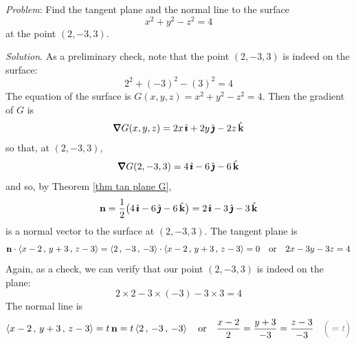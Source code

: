 \begin{eg}\label{eg tan plane D}
\noindent\textit{Problem}:
Find the tangent plane and the normal line to the surface
\begin{equation*}
x^2+y^2-z^2 = 4
\end{equation*}
at the point $(2,-3,3)$.

\medskip
\noindent\textit{Solution}. 
As a preliminary check, note that the point $(2,-3,3)$ is indeed on the surface:
\begin{equation*}
2^2+(-3)^2-(3)^2=4
\end{equation*} 
The equation of the surface is $G(x,y,z)=x^2+y^2-z^2=4$.
Then the gradient of $G$ is
\begin{align*}
\vnabla G(x,y,z) = 2x\,\hi +2y\,\hj-2z\,\hk
\end{align*}
so that, at $(2,-3,3)$,
\begin{equation*}
\vnabla G(2,-3,3) = 4\,\hi -6\,\hj-6\,\hk
\end{equation*}
and so, by Theorem \ref{thm tan plane G},
\begin{equation*}
\mathbf{n} = \frac{1}{2}\big(4\,\hat{\pmb{\imath}} -6\,\hat{\pmb{\jmath}}-6\,\hat{\mathbf{k}}\big)=2\,\hat{\pmb{\imath}}-3\,\hat{\pmb{\jmath}}-3\,\hat{\mathbf{k}}
\end{equation*}
is a normal vector to the surface at $(2,-3,3)$. The tangent plane is
\begin{equation*}
\mathbf{n}\cdot\left< x-2\,,\,y+3\,,\,z-3 \right>
=\left< 2\,,\,-3\,,\, -3\right>\cdot\left< x-2\,,\,y+3\,,\,z-3 \right>
=0\quad\text{or}\quad
2x -3y -3z = 4
\end{equation*}
Again, as a check, we can verify that our point $(2,-3,3)$ is indeed on 
the plane:
\begin{equation*}
2\times 2 - 3\times(-3) -3\times 3 = 4
\end{equation*}
 The normal line is
\begin{equation*}
\llt x-2\,,\,y+3\,,\,z-3 \rgt
=t\,\vn = t\llt 2\,,\,-3\,,\, -3\rgt
\quad\text{or}\quad
\frac{x-2}{2} = \frac{y+3}{-3} = \frac{z-3}{-3}\quad 
  \textcolor{gray}{\Big(=t\Big)}
\end{equation*} 

\end{eg}

